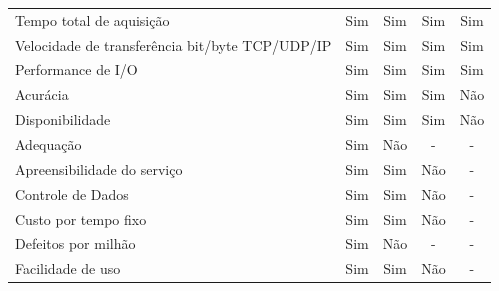 \documentclass[conference]{IEEEtran}
\begin{document}
\begin{table}[]
\begin{tabular}{@{}lcccc@{}}
Tempo total de aquisição                          & Sim                                     & Sim                                     & Sim                                     & Sim                         \\
Velocidade de transferência bit/byte TCP/UDP/IP   & Sim                                     & Sim                                     & Sim                                     & Sim                         \\
Performance de I/O                                & Sim                                     & Sim                                     & Sim                                     & Sim                         \\
Acurácia                                          & Sim                                     & Sim                                     & Sim                                     & \cellcolor[HTML]{EA9999}Não \\
Disponibilidade                                   & Sim                                     & Sim                                     & Sim                                     & \cellcolor[HTML]{EA9999}Não \\
Adequação                                         & Sim                                     & \cellcolor[HTML]{EA9999}Não             & \cellcolor[HTML]{EA9999}-               & \cellcolor[HTML]{EA9999}-   \\
Apreensibilidade do serviço                       & Sim                                     & Sim                                     & \cellcolor[HTML]{EA9999}Não             & \cellcolor[HTML]{EA9999}-   \\
Controle de Dados                                 & Sim                                     & Sim                                     & \cellcolor[HTML]{EA9999}Não             & \cellcolor[HTML]{EA9999}-   \\
Custo por tempo fixo                              & Sim                                     & Sim                                     & \cellcolor[HTML]{EA9999}Não             & \cellcolor[HTML]{EA9999}-   \\
Defeitos por milhão                               & Sim                                     & \cellcolor[HTML]{EA9999}Não             & \cellcolor[HTML]{EA9999}-               & \cellcolor[HTML]{EA9999}-   \\
Facilidade de uso                                 & Sim                                     & Sim                                     & \cellcolor[HTML]{EA9999}Não             & \cellcolor[HTML]{EA9999}-   \\

\end{tabular}
\end{table}
\end{document}
